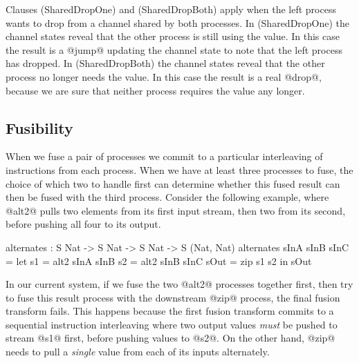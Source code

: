 Clauses (SharedDropOne) and (SharedDropBoth) apply when the left process wants to drop from a channel shared by both processes. In (SharedDropOne) the channel states reveal that the other process is still using the value. In this case the result is a @jump@ updating the channel state to note that the left process has dropped. In (SharedDropBoth) the channel states reveal that the other process no longer needs the value. In this case the result is a real @drop@, because we are sure that neither process requires the value any longer.







\subsection{Fusibility}
\label{s:FusionOrder}
When we fuse a pair of processes we commit to a particular interleaving of instructions from each process. When we have at least three processes to fuse, the choice of which two to handle first can determine whether this fused result can then be fused with the third process. Consider the following example, where @alt2@ pulls two elements from its first input stream, then two from its second, before pushing all four to its output.
\begin{code}
  alternates : S Nat -> S Nat -> S Nat -> S (Nat, Nat)
  alternates sInA sInB sInC
   = let  s1   = alt2 sInA sInB
          s2   = alt2 sInB sInC
          sOut = zip s1 s2
     in   sOut
\end{code}

In our current system, if we fuse the two @alt2@ processes together first, then try to fuse this result process with the downstream @zip@ process, the final fusion transform fails. This happens because the first fusion transform commits to a sequential instruction interleaving where two output values \emph{must} be pushed to stream @s1@ first, before pushing values to @s2@. On the other hand, @zip@ needs to pull a \emph{single} value from each of its inputs alternately.

